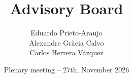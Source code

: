 \documentclass[aspectratio=1609,9pt]{beamer}
\author[UPC -- CITCEA]{\texorpdfstring{Eduardo Prieto-Araujo\\Alexandre Gràcia Calvo\\Carlos Herrera Vázquez}{Eduardo Prieto-Araujo; Alexandre Gràcia Calvo; Carlos Herrera Vázquez}}
\title[WP4 -- TenSyGrid Toolbox]{Advisory Board}
\date[Nov 2026]{Plenary meeting -- 27th, November 2026}
\begin{document}
\begingroup
{}
\begin{frame}
  \titlepage
\end{frame}
\endgroup

\end{document}
